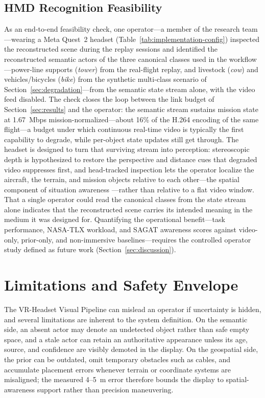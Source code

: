 \documentclass[fleqn]{VRIH2025}
\begin{document}
\subsection{HMD Recognition Feasibility}
\label{sec:hmd-feasibility}
As an end-to-end feasibility check, one operator---a member of the research team---wearing a Meta Quest~2 headset (Table~\ref{tab:implementation-config}) inspected the reconstructed scene during the replay sessions and identified the reconstructed semantic actors of the three canonical classes used in the workflow---power-line supports (\textit{tower}) from the real-flight replay, and livestock (\textit{cow}) and vehicles/bicycles (\textit{bike}) from the synthetic multi-class scenario of Section~\ref{sec:degradation}---from the semantic state stream alone, with the video feed disabled. The check closes the loop between the link budget of Section~\ref{sec:results} and the operator: the semantic stream sustains mission state at 1.67~Mbps mission-normalized---about 16\% of the H.264 encoding of the same flight---a budget under which continuous real-time video is typically the first capability to degrade, while per-object state updates still get through. The headset is designed to turn that surviving stream into perception: stereoscopic depth is hypothesized to restore the perspective and distance cues that degraded video suppresses first, and head-tracked inspection lets the operator localize the aircraft, the terrain, and mission objects relative to each other---the spatial component of situation awareness \cite{endsley1995theory}---rather than relative to a flat video window. That a single operator could read the canonical classes from the state stream alone indicates that the reconstructed scene carries its intended meaning in the medium it was designed for. Quantifying the operational benefit---task performance, NASA-TLX workload, and SAGAT awareness scores against video-only, prior-only, and non-immersive baselines---requires the controlled operator study defined as future work (Section~\ref{sec:discussion}).

\section{Limitations and Safety Envelope}
\label{sec:limitations}

The VR-Headset Visual Pipeline can mislead an operator if uncertainty is hidden, and several limitations are inherent to the system definition. On the semantic side, an absent actor may denote an undetected object rather than safe empty space, and a stale actor can retain an authoritative appearance unless its age, source, and confidence are visibly demoted in the display. On the geospatial side, the prior can be outdated, omit temporary obstacles such as cables, and accumulate placement errors whenever terrain or coordinate systems are misaligned; the measured 4--5~m error therefore bounds the display to spatial-awareness support rather than precision maneuvering.
\end{document}
